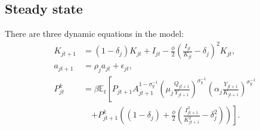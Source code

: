 


\subsection{Steady state} \label{subsec:SteadyState}

There are three dynamic equations in the model:
\begin{align*}
K_{jt+1} & =(1-\delta_{j})K_{jt}+I_{jt}-\frac{\phi}{2}\left(\frac{I_{jt}}{K_{jt}}-\delta_{j}\right)^{2}K_{jt},\\
a_{jt+1} & =\rho_{j}a_{jt}+\epsilon_{jt},\\
P_{jt}^{k} & =\beta\mathbb{E}_{t}\left[P_{jt+1}A_{jt+1}^{1-\sigma_{y}^{-1}}\left(\mu_{j}\frac{Q_{jt+1}}{Y_{jt+1}}\right)^{\sigma_{q}^{-1}}\left(\alpha_{j}\frac{Y_{jt+1}}{K_{jt+1}}\right)^{\sigma_{y}^{-1}} \right. \\
& \quad \left. +P_{jt+1}^{k}\left((1-\delta_{j})+\frac{\phi}{2}\left(\frac{I_{jt+1}^{2}}{K_{jt+1}^{2}}-\delta_{j}^{2}\right)\right)\right].
\end{align*}

